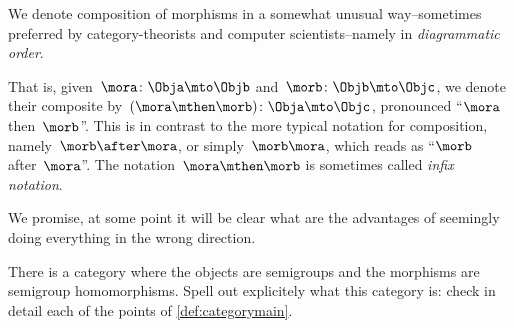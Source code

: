 

\begin{remark}
  We denote composition of morphisms in a somewhat unusual way--sometimes preferred by category-theorists and computer scientists--namely in \emph{diagrammatic order}.

  That is, given~$\mora \colon \Obja\mto \Objb$ and~$\morb \colon \Objb \mto \Objc$, we denote their composite by~$(\mora\mthen \morb)\colon \Obja\mto \Objc$, pronounced ``$\mora$ then~$\morb$''.
  This is in contrast to the more typical notation for composition, namely~$\morb\after \mora$, or simply~$\morb \mora$, which reads as ``$\morb$ after~$\mora$''.
  The notation~$\mora \mthen \morb$ is sometimes called \emph{infix notation}.

  We promise, at some point it will be clear what are the advantages of seemingly doing everything
  in the wrong direction.
\end{remark}

\begin{gradedexercise}
There is a category where the objects are semigroups and the morphisms are semigroup homomorphisms. Spell out explicitely what this category is: check in detail each of the points of \cref{def:categorymain}.
\end{gradedexercise}


